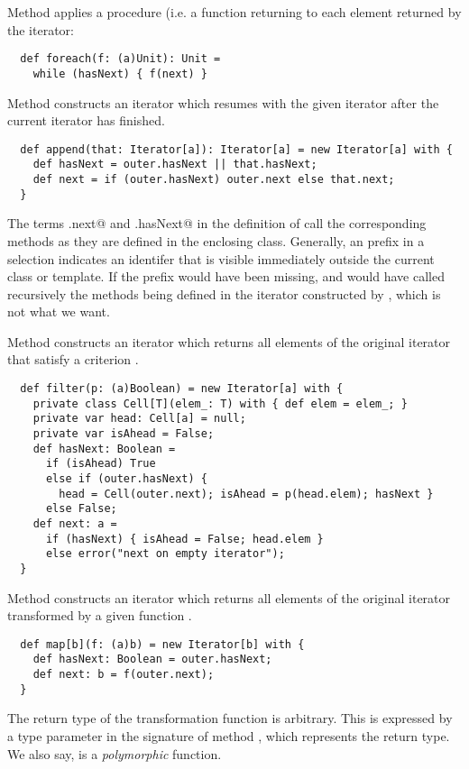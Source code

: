 \documentclass[11pt]{report}
\begin{document}
Method \verb@foreach@ applies a procedure (i.e. a function
returning \verb@Unit@ to each element returned by the iterator:
\begin{verbatim}
  def foreach(f: (a)Unit): Unit =
    while (hasNext) { f(next) }
\end{verbatim}

Method \verb@append@ constructs an iterator which resumes with the
given iterator \verb@it@ after the current iterator has finished.
\begin{verbatim}
  def append(that: Iterator[a]): Iterator[a] = new Iterator[a] with {
    def hasNext = outer.hasNext || that.hasNext;
    def next = if (outer.hasNext) outer.next else that.next;
  }
\end{verbatim}
The terms \verb@outer.next@ and \verb@outer.hasNext@ in the definition
of \verb@append@ call the corresponding methods as they are defined in
the enclosing \verb@Iterator@ class. Generally, an
\verb@outer@ prefix in a selection indicates an identifer that is
visible immediately outside the current class or template. If the
\verb@outer@ prefix would have been missing,
\verb@hasNext@ and \verb@next@ would have
called recursively the methods being defined in the iterator
constructed by \verb@append@, which is not what we want.

Method \verb@filter@ constructs an iterator which returns all elements
of the original iterator that satisfy a criterion \verb@p@.
\begin{verbatim}
  def filter(p: (a)Boolean) = new Iterator[a] with {
    private class Cell[T](elem_: T) with { def elem = elem_; }
    private var head: Cell[a] = null;
    private var isAhead = False;
    def hasNext: Boolean =
      if (isAhead) True
      else if (outer.hasNext) {
        head = Cell(outer.next); isAhead = p(head.elem); hasNext }
      else False;
    def next: a =
      if (hasNext) { isAhead = False; head.elem }
      else error("next on empty iterator");
  }
\end{verbatim}
Method \verb@map@ constructs an iterator which returns all elements of
the original iterator transformed by a given function \verb@f@.
\begin{verbatim}
  def map[b](f: (a)b) = new Iterator[b] with {
    def hasNext: Boolean = outer.hasNext;
    def next: b = f(outer.next);
  }
\end{verbatim}
The return type of the transformation function \verb@f@ is
arbitrary. This is expressed by a type parameter \verb@b@ in the
signature of method \verb@map@, which represents the return type.
We also say, \verb@map@ is a {\em polymorphic} function.
\end{document}
